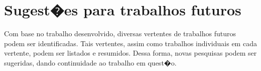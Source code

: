 
\chapter{Sugest�es para trabalhos futuros}
\thispagestyle{empty} %

Com base no trabalho desenvolvido, diversas vertentes de trabalhos futuros podem ser identificadas.
%
Tais vertentes, assim como trabalhos individuais em cada vertente, podem ser listados e resumidos.
%
Dessa forma, novas pesquisas podem ser sugeridas, dando continuidade ao trabalho em quest�o.
